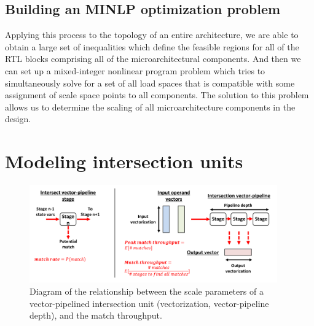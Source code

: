 \subsection{Building an MINLP optimization problem}

Applying this process to the topology of an entire architecture, we are able to obtain a large set of inequalities which define the feasible regions for all of the RTL blocks comprising all of the microarchitectural components. And then we can set up a mixed-integer nonlinear program problem which tries to simultaneously solve for a set of all load spaces that is compatible with some assignment of scale space points to all components. The solution to this problem allows us to determine the scaling of all microarchitecture components in the design.

\section{Modeling intersection units}

\begin{figure}[ht]
    \centering
    \includegraphics[width=0.95\textwidth]{figures/isect_model.pdf}
    \caption{Diagram of the relationship between the scale parameters of a vector-pipelined intersection unit (vectorization, vector-pipeline depth), and the match throughput.}
    \label{fig:isect_model}
\end{figure}